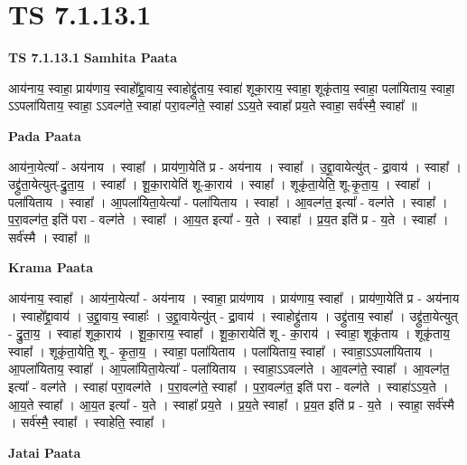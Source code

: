 \documentclass[17pt]{extarticle}
\begin{document}
\section{ TS 7.1.13.1 }

\textbf{TS 7.1.13.1 } \newline
\textbf{Samhita Paata} \newline

आय॑नाय॒ स्वाहा॒ प्राय॑णाय॒ स्वाहो᳚द्द्रा॒वाय॒ स्वाहोद्द्रु॑ताय॒ स्वाहा॑ शूका॒राय॒ स्वाहा॒ शूकृ॑ताय॒ स्वाहा॒ पला॑यिताय॒ स्वाहा॒ ऽऽपला॑यिताय॒ स्वाहा॒ ऽऽवल्ग॑ते॒ स्वाहा॑ परा॒वल्ग॑ते॒ स्वाहा॑ ऽऽय॒ते स्वाहा᳚ प्रय॒ते स्वाहा॒ सर्व॑स्मै॒ स्वाहा᳚ ॥ \newline

\textbf{Pada Paata} \newline

आय॑ना॒येत्या᳚ - अय॑नाय । स्वाहा᳚ । प्राय॑णा॒येति॑ प्र - अय॑नाय । स्वाहा᳚ । उ॒द्द्रा॒वायेत्यु॑त् - द्रा॒वाय॑ । स्वाहा᳚ । उद्द्रु॑ता॒येत्युत्-द्रु॒ता॒य॒ । स्वाहा᳚ । शू॒का॒रायेति॑ शू-का॒राय॑ । स्वाहा᳚ । शूकृ॑ता॒येति॒ शू-कृ॒ता॒य॒ । स्वाहा᳚ । पला॑यिताय । स्वाहा᳚ । आ॒पला॑यिता॒येत्या᳚ - पला॑यिताय । स्वाहा᳚ । आ॒वल्ग॑त॒ इत्या᳚ - वल्ग॑ते । स्वाहा᳚ । प॒रा॒वल्ग॑त॒ इति॑ परा - वल्ग॑ते । स्वाहा᳚ । आ॒य॒त इत्या᳚ - य॒ते । स्वाहा᳚ । प्र॒य॒त इति॑ प्र - य॒ते । स्वाहा᳚ । सर्व॑स्मै । स्वाहा᳚ ॥  \newline


\textbf{Krama Paata} \newline

आय॑नाय॒ स्वाहा᳚ । आय॑ना॒येत्या᳚ - अय॑नाय । स्वाहा॒ प्राय॑णाय । प्राय॑णाय॒ स्वाहा᳚ । प्राय॑णा॒येति॑ प्र - अय॑नाय । स्वाहो᳚द्द्रा॒वाय॑ । उ॒द्द्रा॒वाय॒ स्वाहाः᳚ । उ॒द्द्रा॒वायेत्यु॑त् - द्रा॒वाय॑ । स्वाहोद्द्रु॑ताय । उद्द्रु॑ताय॒ स्वाहा᳚ । उद्द्रु॑ता॒येत्युत् - द्रु॒ता॒य॒ । स्वाहा॑ शूका॒राय॑ । शू॒का॒राय॒ स्वाहा᳚ । शू॒का॒रायेति॑ शू - का॒राय॑ । स्वाहा॒ शूकृ॑ताय । शूकृ॑ताय॒ स्वाहा᳚ । शूकृ॑ता॒येति॒ शू - कृ॒ता॒य॒ । स्वाहा॒ पला॑यिताय । पला॑यिताय॒ स्वाहा᳚ । स्वाहा॒ऽऽपला॑यिताय । आ॒पला॑यिताय॒ स्वाहा᳚ । आ॒पला॑यिता॒येत्या᳚ - पला॑यिताय । स्वाहा॒ऽऽवल्ग॑ते । आ॒वल्ग॑ते॒ स्वाहा᳚ । आ॒वल्ग॑त॒ इत्या᳚ - वल्ग॑ते । स्वाहा॑ परा॒वल्ग॑ते । प॒रा॒वल्ग॑ते॒ स्वाहा᳚ । प॒रा॒वल्ग॑त॒ इति॑ परा - वल्ग॑ते । स्वाहा॑ऽऽय॒ते । आ॒य॒ते स्वाहा᳚ । आ॒य॒त इत्या᳚ - य॒ते । स्वाहा᳚ प्रय॒ते । प्र॒य॒ते स्वाहा᳚ । प्र॒य॒त इति॑ प्र - य॒ते । स्वाहा॒ सर्व॑स्मै । सर्व॑स्मै॒ स्वाहा᳚ । स्वाहेति॒ स्वाहा᳚ । \newline

\textbf{Jatai Paata} \newline
\end{document}
